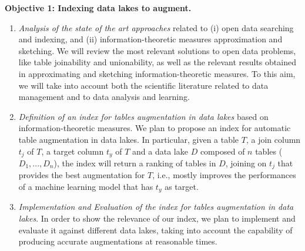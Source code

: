 \noindent\textbf{Objective 1: Indexing data lakes to augment.}
\begin{enumerate}
    \item \textit{Analysis of the state of the art approaches} related to (i) open data searching and indexing, and (ii) information-theoretic measures approximation and sketching. We will review the most relevant solutions to open data problems, like table joinability and unionability, as well as the relevant results obtained in approximating and sketching information-theoretic measures. To this aim, we will take into account both the scientific literature related to data management and to data analysis and learning.
    \item \textit{Definition of an index for tables augmentation in data lakes} based on information-theoretic measures. We plan to propose an index for automatic table augmentation in data lakes. In particular, given a table $T$, a join column $t_j$ of $T$, a target column $t_y$ of $T$ and a data lake $D$ composed of $n$ tables ($D_1,...,D_n$), the index will return a ranking of tables in $D$, joining on $t_j$ that provides the best augmentation for $T$, i.e., mostly improves the performances of a machine learning model that has $t_y$ as target.
    \item \textit{Implementation and Evaluation of the index for tables augmentation in data lakes}. In order to show the relevance of our index, we plan to implement and evaluate it against different data lakes, taking into account the capability of producing accurate augmentations at reasonable times.
\end{enumerate}

